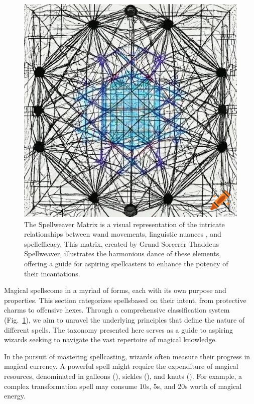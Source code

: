 \begin{figure}
    \includegraphics[width=\textwidth]{fig/img1.png}
    \caption{The Spellweaver Matrix is a visual representation of the intricate relationships between \gls{wand} movements, linguistic nuances \cite{linguisticnuances2016}, and \gls{spell}efficacy. This matrix, created by Grand Sorcerer Thaddeus Spellweaver, illustrates the harmonious dance of these elements, offering a guide for aspiring spellcasters to enhance the potency of their incantations.}
    \label{fig:img1}
  \end{figure}

Magical \glspl{spell}come in a myriad of forms, each with its own purpose and properties. This section categorizes \glspl{spell}based on their intent, from protective charms to offensive hexes. Through a comprehensive classification system (Fig.~\ref{fig:img1}), we aim to unravel the underlying principles that define the nature of different spells. The taxonomy presented here serves as a guide to aspiring wizards seeking to navigate the vast repertoire of magical knowledge.

In the pursuit of mastering spellcasting, wizards often measure their progress in magical currency. A powerful spell might require the expenditure of magical resources, denominated in galleons (\si{\galleon}), sickles (\si{\sickle}), and knuts (\si{\knut}). For example, a complex transformation spell may consume \SI{10}{\galleon}s, \SI{5}{\sickle}s, and \SI{20}{\knut}s worth of magical energy.

